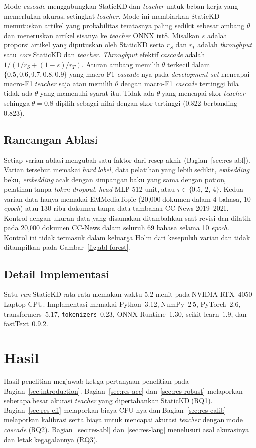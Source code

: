 \documentclass{ieeeaccess}
\newcommand{\en}[1]{\textit{#1}}
\begin{document}
Mode \en{cascade} menggabungkan StaticKD dan \en{teacher} untuk beban kerja yang memerlukan akurasi setingkat \en{teacher}. Mode ini membiarkan StaticKD memutuskan artikel yang probabilitas teratasnya paling sedikit sebesar ambang $\theta$ dan meneruskan artikel sisanya ke \en{teacher} ONNX int8. Misalkan $s$ adalah proporsi artikel yang diputuskan oleh StaticKD serta $r_S$ dan $r_T$ adalah \en{throughput} satu \en{core} StaticKD dan \en{teacher}. \en{Throughput} efektif \en{cascade} adalah $1/(1/r_S+(1-s)/r_T)$. Aturan ambang memilih $\theta$ terkecil dalam $\{0.5,0.6,0.7,0.8,0.9\}$ yang macro-F1 \en{cascade}-nya pada \en{development set} mencapai macro-F1 \en{teacher} saja atau memilih $\theta$ dengan macro-F1 \en{cascade} tertinggi bila tidak ada $\theta$ yang memenuhi syarat itu. Tidak ada $\theta$ yang mencapai skor \en{teacher} sehingga $\theta=0.8$ dipilih sebagai nilai dengan skor tertinggi (0.822 berbanding 0.823).

\subsection{Rancangan Ablasi}
\label{sec:design}
Setiap varian ablasi mengubah satu faktor dari resep akhir (Bagian~\ref{sec:res-abl}). Varian tersebut memakai \en{hard label}, data pelatihan yang lebih sedikit, \en{embedding} beku, \en{embedding} acak dengan simpangan baku yang sama dengan potion, pelatihan tanpa \en{token dropout}, \en{head} MLP 512 unit, atau $\tau\in\{0.5,\,2,\,4\}$. Kedua varian data hanya memakai EMMediaTopic (20,000 dokumen dalam 4 bahasa, 10 \en{epoch}) atau 130 ribu dokumen tanpa data tambahan CC-News 2019--2021. Kontrol dengan ukuran data yang disamakan ditambahkan saat revisi dan dilatih pada 20,000 dokumen CC-News dalam seluruh 69 bahasa selama 10 \en{epoch}. Kontrol ini tidak termasuk dalam keluarga Holm dari kesepuluh varian dan tidak ditampilkan pada Gambar~\ref{fig:abl-forest}.

\subsection{Detail Implementasi}
\label{sec:impl}
Satu \en{run} StaticKD rata-rata memakan waktu 5.2 menit pada NVIDIA RTX~4050 Laptop GPU. Implementasi memakai Python~3.12, NumPy~2.5, PyTorch~2.6, transformers~5.17, \texttt{tokenizers}~0.23, ONNX Runtime~1.30, scikit-learn~1.9, dan fastText~0.9.2.

\section{Hasil}
\label{sec:results}
Hasil penelitian menjawab ketiga pertanyaan penelitian pada Bagian~\ref{sec:introduction}. Bagian~\ref{sec:res-acc} dan~\ref{sec:res-robust} melaporkan seberapa besar akurasi \en{teacher} yang dipertahankan StaticKD (RQ1). Bagian~\ref{sec:res-eff} melaporkan biaya CPU-nya dan Bagian~\ref{sec:res-calib} melaporkan kalibrasi serta biaya untuk mencapai akurasi \en{teacher} dengan mode \en{cascade} (RQ2). Bagian~\ref{sec:res-abl} dan~\ref{sec:res-lang} menelusuri asal akurasinya dan letak kegagalannya (RQ3).
\end{document}
